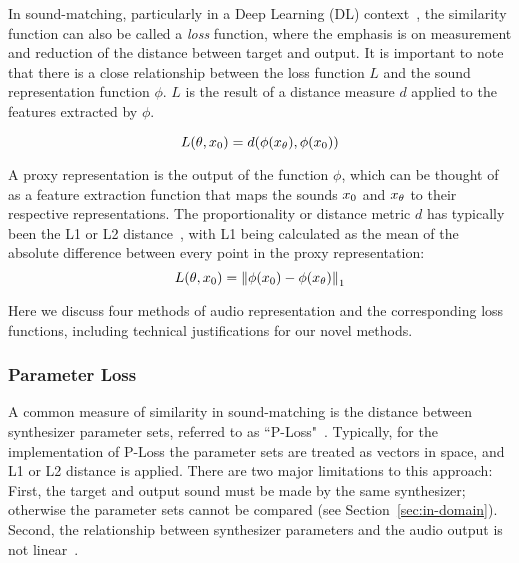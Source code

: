 In sound-matching, particularly in a Deep Learning (\gls{DL}) context~\cite{goodfellow2016deep}, the similarity function can also be called a \textit{loss} function, where the emphasis is on measurement and reduction of the distance between target and output. It is important to note that there is a close relationship between the loss function $L$ and the sound representation function $\phi$. $L$ is the result of a distance measure $d$ applied to the features extracted by $\phi$. 

\[
L(\theta, x_{0}) = d(\phi(x_{\theta}), \phi(x_{0}))
\]

\noindent

A proxy representation is the output of the function \( \phi \), which can be thought of as a feature extraction function that maps the sounds  $x_{0}$ and $x_{\theta}$  to their respective representations. 
The proportionality or distance metric $d$ has typically been the L1 or L2 distance~\cite{turian2020sorry,richard2025model}, with L1 being calculated as the mean of the absolute difference between every point in the proxy representation:
\[
L(\theta, x_{0}) = \left\| \phi(x_{0}) - \phi(x_{\theta}) \right\|_1
\]

Here we discuss four methods of audio representation and the corresponding loss functions, including technical justifications for our novel methods.

\subsubsection{Parameter Loss}
A common measure of similarity in sound-matching is the distance between synthesizer parameter sets, referred to as ``P-Loss"~\cite{han2023perceptual}. Typically, for the implementation of P-Loss the parameter sets are treated as vectors in space, and L1 or L2 distance is applied. There are two major limitations to this approach: First, the target and output sound must be made by the same synthesizer; otherwise the parameter sets cannot be compared (see Section~\ref{sec:in-domain}). Second, the relationship between synthesizer parameters and the audio output is not linear~\cite{shier2020spiegelib,han2023perceptual,esling2019flow}. 

